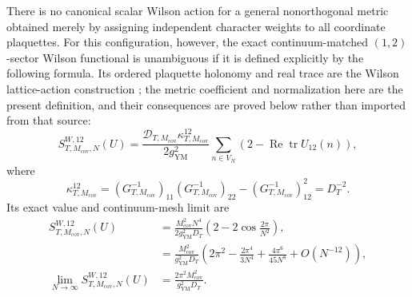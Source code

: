 \begin{theorem}
There is no canonical scalar Wilson action for a general nonorthogonal
metric obtained merely by assigning independent character weights to all
coordinate plaquettes.  For this configuration, however, the exact
continuum-matched \((1,2)\)-sector Wilson functional is unambiguous if it is
defined explicitly by the following formula.  Its ordered plaquette
holonomy and real trace are the Wilson lattice-action construction
\cite{Wilson_1974}; the metric coefficient and normalization here are the
present definition, and their consequences are proved below rather than
imported from that source:
\begin{equation}
 S^{W,12}_{T,M_{\mathrm{cov}},N}(U)
 =\frac{\mathcal D_{T,M_{\mathrm{cov}}}\kappa^{12}_{T,M_{\mathrm{cov}}}}
        {2g_{\mathrm{YM}}^2}
   \sum_{n\in V_N}
   \left(2-\operatorname{Re}\operatorname{tr}U_{12}(n)\right),
 \label{cusp-link-wilson-sector-definition}
\end{equation}
where
\begin{equation}
 \kappa^{12}_{T,M_{\mathrm{cov}}}
 =(G_{T,M_{\mathrm{cov}}}^{-1})_{11}
  (G_{T,M_{\mathrm{cov}}}^{-1})_{22}
 -(G_{T,M_{\mathrm{cov}}}^{-1})_{12}^2
 =D_T^{-2}.
 \label{cusp-link-two-form-minor}
\end{equation}
Its exact value and continuum-mesh limit are
\begin{align}
 S^{W,12}_{T,M_{\mathrm{cov}},N}(U)
 &=\frac{M_{\mathrm{cov}}^2N^4}{2g_{\mathrm{YM}}^2D_T}
   \left(2-2\cos\frac{2\pi}{N^2}\right),
 \label{cusp-link-wilson-sector-value}\\
 &=\frac{M_{\mathrm{cov}}^2}{g_{\mathrm{YM}}^2D_T}
   \left(
    2\pi^2-\frac{2\pi^4}{3N^4}
    +\frac{4\pi^6}{45N^8}+O(N^{-12})
   \right),
 \label{cusp-link-wilson-sector-expansion}\\
 \lim_{N\to\infty}S^{W,12}_{T,M_{\mathrm{cov}},N}(U)
 &=\frac{2\pi^2M_{\mathrm{cov}}^2}{g_{\mathrm{YM}}^2D_T}.
 \label{cusp-link-wilson-sector-limit}
\end{align}
\end{theorem}

